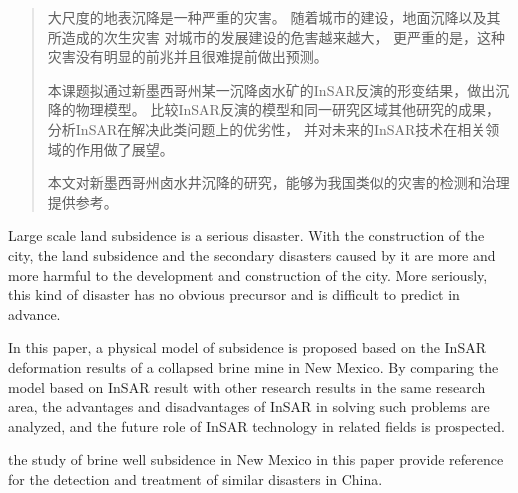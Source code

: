 

\begin{abstract}
  大尺度的地表沉降是一种严重的灾害。
  随着城市的建设，地面沉降以及其所造成的次生灾害
  对城市的发展建设的危害越来越大，
  更严重的是，这种灾害没有明显的前兆并且很难提前做出预测。
  
  本课题拟通过新墨西哥州某一沉降卤水矿的InSAR反演的形变结果，做出沉降的物理模型。
  比较InSAR反演的模型和同一研究区域其他研究的成果，分析InSAR在解决此类问题上的优劣性，
  并对未来的InSAR技术在相关领域的作用做了展望。

  本文对新墨西哥州卤水井沉降的研究，能够为我国类似的灾害的检测和治理提供参考。
\end{abstract}

\begin{enabstract}
  Large scale land subsidence is a serious disaster. 
  With the construction of the city, 
  the land subsidence and the secondary disasters caused by it 
  are more and more harmful to the development and construction of the city. 
  More seriously, this kind of disaster has no obvious precursor 
  and is difficult to predict in advance.

  In this paper, a physical model of subsidence is proposed 
  based on the InSAR deformation results of a collapsed brine mine in New Mexico. 
  By comparing the model based on InSAR result with other research results in the same research area, 
  the advantages and disadvantages of InSAR in solving such problems are analyzed, 
  and the future role of InSAR technology in related fields is prospected.

  the study of brine well subsidence in New Mexico in this paper 
  provide reference for the detection and treatment of similar disasters in China.
\end{enabstract}
